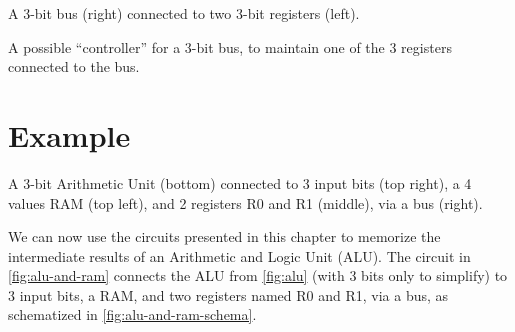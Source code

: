 \begin{Figure}
  

  \caption{A 3-bit bus (right) connected to two 3-bit registers
    (left).}\label{fig:bus-3}
\end{Figure}

\begin{Figure}
  

  \caption{A possible ``controller'' for a 3-bit bus, to maintain one of the 3
  registers connected to the bus.}\label{fig:bus-controller}
\end{Figure}

\section{Example}\label{subsection:alu-and-ram-example}

\begin{Figure}
  

  \caption{A 3-bit Arithmetic Unit (bottom) connected to 3 input bits (top
  right), a 4 values RAM (top left), and 2 registers R0 and R1 (middle), via a
  bus (right).}\label{fig:alu-and-ram}
\end{Figure}

We can now use the circuits presented in this chapter to memorize the
intermediate results of an Arithmetic and Logic Unit (ALU). The circuit in
\cref{fig:alu-and-ram} connects the ALU from \cref{fig:alu} (with 3 bits only
to simplify) to 3 input bits, a RAM, and two registers named R0 and R1, via a
bus, as schematized in \cref{fig:alu-and-ram-schema}.

